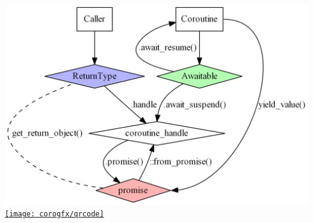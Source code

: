 \documentclass[aspectratio=169]{beamer}
\begin{document}
\begin{frame}
\vspace{20pt}

\begin{center}
  \includegraphics[height=.6\textheight]{corogfx/acquaintances05.png}
  \hspace{12ex}
  \href{https://github.com/ComicSansMS/cpp20_coroutine_cheat_sheet}{\texttt{[image: corogfx/qrcode]}}
\end{center}

\end{frame}
\end{document}
